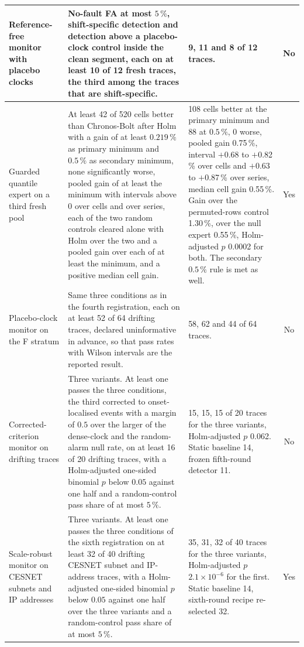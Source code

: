 {\begin{longtable}{p{1.9cm} p{4.4cm} p{5.2cm} c}
\midrule
Reference-free monitor with placebo clocks & No-fault FA at most $5\,\%$, shift-specific detection and detection above a placebo-clock control inside the clean segment, each on at least 10 of 12 fresh traces, the third among the traces that are shift-specific. & 9, 11 and 8 of 12 traces. & No \\
\midrule
Guarded quantile expert on a third fresh pool & At least 42 of 520 cells better than Chronos-Bolt after Holm with a gain of at least $0.219\,\%$ as primary minimum and $0.5\,\%$ as secondary minimum, none significantly worse, pooled gain of at least the minimum with intervals above $0$ over cells and over series, each of the two random controls cleared alone with Holm over the two and a pooled gain over each of at least the minimum, and a positive median cell gain. & 108 cells better at the primary minimum and 88 at $0.5\,\%$, 0 worse, pooled gain 0.75\,\%, interval $+$0.68 to $+$0.82\,\% over cells and $+$0.63 to $+$0.87\,\% over series, median cell gain 0.55\,\%. Gain over the permuted-rows control 1.30\,\%, over the null expert 0.55\,\%, Holm-adjusted $p$ 0.0002 for both. The secondary $0.5\,\%$ rule is met as well. & Yes \\
\midrule
Placebo-clock monitor on the F stratum & Same three conditions as in the fourth registration, each on at least 52 of 64 drifting traces, declared uninformative in advance, so that pass rates with Wilson intervals are the reported result. & 58, 62 and 44 of 64 traces. & No \\
\midrule
Corrected-criterion monitor on drifting traces & Three variants. At least one passes the three conditions, the third corrected to onset-localised events with a margin of $0.5$ over the larger of the dense-clock and the random-alarm null rate, on at least 16 of 20 drifting traces, with a Holm-adjusted one-sided binomial $p$ below $0.05$ against one half and a random-control pass share of at most $5\,\%$. & 15, 15, 15 of 20 traces for the three variants, Holm-adjusted $p$ 0.062. Static baseline 14, frozen fifth-round detector 11. & No \\
\midrule
Scale-robust monitor on CESNET subnets and IP addresses & Three variants. At least one passes the three conditions of the sixth registration on at least 32 of 40 drifting CESNET subnet and IP-address traces, with a Holm-adjusted one-sided binomial $p$ below $0.05$ against one half over the three variants and a random-control pass share of at most $5\,\%$. & 35, 31, 32 of 40 traces for the three variants, Holm-adjusted $p$ $2.1\times 10^{-6}$ for the first. Static baseline 14, sixth-round recipe re-selected 32. & Yes \\
\end{longtable}
}

